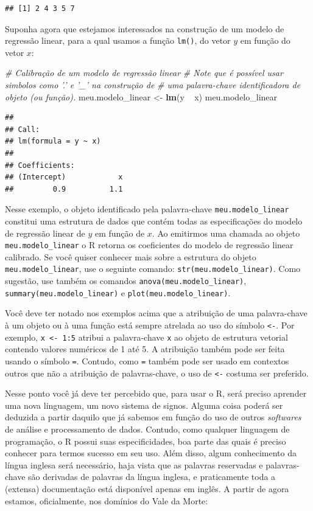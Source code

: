 \documentclass[]{book}
\newenvironment{Shaded}{\begin{snugshade}}{\end{snugshade}}
\newcommand{\KeywordTok}[1]{\textcolor[rgb]{0.13,0.29,0.53}{\textbf{{#1}}}}
\newcommand{\StringTok}[1]{\textcolor[rgb]{0.31,0.60,0.02}{{#1}}}
\newcommand{\CommentTok}[1]{\textcolor[rgb]{0.56,0.35,0.01}{\textit{{#1}}}}
\newcommand{\NormalTok}[1]{{#1}}
\begin{document}
\begin{verbatim}
## [1] 2 4 3 5 7
\end{verbatim}

Suponha agora que estejamos interessados na construção de um modelo de
regressão linear, para a qual usamos a função \texttt{lm()}, do vetor
\(y\) em função do vetor \(x\):

\begin{Shaded}
\begin{Highlighting}[]
\CommentTok{# Calibração de um modelo de regressão linear}
\CommentTok{# Note que é possível usar simbolos como '.' e '_' na construção de }
\CommentTok{# uma palavra-chave identificadora de objeto (ou função).}
\NormalTok{meu.modelo_linear <-}\StringTok{ }\KeywordTok{lm}\NormalTok{(y ~}\StringTok{ }\NormalTok{x)}
\NormalTok{meu.modelo_linear}
\end{Highlighting}
\end{Shaded}

\begin{verbatim}
## 
## Call:
## lm(formula = y ~ x)
## 
## Coefficients:
## (Intercept)            x  
##         0.9          1.1
\end{verbatim}

Nesse exemplo, o objeto identificado pela palavra-chave
\texttt{meu.modelo\_linear} constitui uma estrutura de dados que contém
todas as especificações do modelo de regressão linear de \(y\) em função
de \(x\). Ao emitirmos uma chamada ao objeto \texttt{meu.modelo\_linear}
o R retorna os coeficientes do modelo de regressão linear calibrado. Se
você quiser conhecer mais sobre a estrutura do objeto
\texttt{meu.modelo\_linear}, use o seguinte comando:
\texttt{str(meu.modelo\_linear)}. Como sugestão, use também os comandos
\texttt{anova(meu.modelo\_linear)}, \texttt{summary(meu.modelo\_linear)}
e \texttt{plot(meu.modelo\_linear)}.

Você deve ter notado nos exemplos acima que a atribuição de uma
palavra-chave à um objeto ou à uma função está sempre atrelada ao uso do
símbolo \texttt{\textless{}-}. Por exemplo,
\texttt{x\ \textless{}-\ 1:5} atribui a palavra-chave \texttt{x} ao
objeto de estrutura vetorial contendo valores numéricos de 1 até 5. A
atribuição também pode ser feita usando o símbolo \texttt{=}. Contudo,
como \texttt{=} também pode ser usado em contextos outros que não a
atribuição de palavras-chave, o uso de \texttt{\textless{}-} costuma ser
preferido.

Nesse ponto você já deve ter percebido que, para usar o R, será preciso
aprender uma nova linguagem, um novo sistema de signos. Alguma coisa
poderá ser deduzida a partir daquilo que já sabemos em função do uso de
outros \emph{softwares} de análise e processamento de dados. Contudo,
como qualquer linguagem de programação, o R possui suas especificidades,
boa parte das quais é preciso conhecer para termos sucesso em seu uso.
Além disso, algum conhecimento da língua inglesa será necessário, haja
vista que as palavras reservadas e palavras-chave são derivadas de
palavras da língua inglesa, e praticamente toda a (extensa) documentação
está disponível apenas em inglês. A partir de agora estamos,
oficialmente, nos domínios do Vale da Morte:
\end{document}
